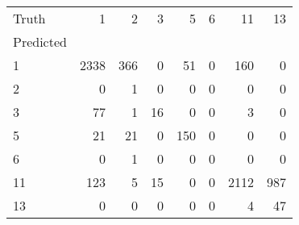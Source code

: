 \begin{tabular}{lrrrrrrr}
\toprule
Truth & 1 & 2 & 3 & 5 & 6 & 11 & 13 \\
Predicted &  &  &  &  &  &  &  \\
\midrule
1 & 2338 & 366 & 0 & 51 & 0 & 160 & 0 \\
2 & 0 & 1 & 0 & 0 & 0 & 0 & 0 \\
3 & 77 & 1 & 16 & 0 & 0 & 3 & 0 \\
5 & 21 & 21 & 0 & 150 & 0 & 0 & 0 \\
6 & 0 & 1 & 0 & 0 & 0 & 0 & 0 \\
11 & 123 & 5 & 15 & 0 & 0 & 2112 & 987 \\
13 & 0 & 0 & 0 & 0 & 0 & 4 & 47 \\
\bottomrule
\end{tabular}

